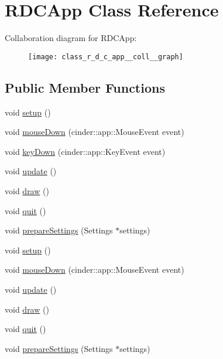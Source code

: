 \hypertarget{class_r_d_c_app}{\section{R\-D\-C\-App Class Reference}
\label{class_r_d_c_app}
}


Collaboration diagram for R\-D\-C\-App\-:\nopagebreak
\begin{figure}[H]
\begin{center}
\leavevmode
\texttt{[image: class\_r\_d\_c\_app\_\_coll\_\_graph]}
\end{center}
\end{figure}
\subsection*{Public Member Functions}
\begin{DoxyCompactItemize}
\item 
void \hyperlink{class_r_d_c_app_a2beba15c6e8e8e6f6201a8a50d8da0f4}{setup} ()
\item 
void \hyperlink{class_r_d_c_app_aaaa5b21bfaa4718548670da8ef85874a}{mouse\-Down} (cinder\-::app\-::\-Mouse\-Event event)
\item 
void \hyperlink{class_r_d_c_app_ae219f6d65636dfd25de715d142fdea7a}{key\-Down} (cinder\-::app\-::\-Key\-Event event)
\item 
void \hyperlink{class_r_d_c_app_a723f728fbaa75cf513d4a592ebba124f}{update} ()
\item 
void \hyperlink{class_r_d_c_app_ae9e4cc30d7dd25d5fc65d712e64d722f}{draw} ()
\item 
void \hyperlink{class_r_d_c_app_ab24352d72c0e773c6edd629584270c8e}{quit} ()
\item 
void \hyperlink{class_r_d_c_app_a03237f9900e117ee9cf6fade74b3ada1}{prepare\-Settings} (Settings $\ast$settings)
\item 
void \hyperlink{class_r_d_c_app_a2beba15c6e8e8e6f6201a8a50d8da0f4}{setup} ()
\item 
void \hyperlink{class_r_d_c_app_aaaa5b21bfaa4718548670da8ef85874a}{mouse\-Down} (cinder\-::app\-::\-Mouse\-Event event)
\item 
void \hyperlink{class_r_d_c_app_a723f728fbaa75cf513d4a592ebba124f}{update} ()
\item 
void \hyperlink{class_r_d_c_app_ae9e4cc30d7dd25d5fc65d712e64d722f}{draw} ()
\item 
void \hyperlink{class_r_d_c_app_ab24352d72c0e773c6edd629584270c8e}{quit} ()
\item 
void \hyperlink{class_r_d_c_app_a03237f9900e117ee9cf6fade74b3ada1}{prepare\-Settings} (Settings $\ast$settings)
\end{DoxyCompactItemize}


